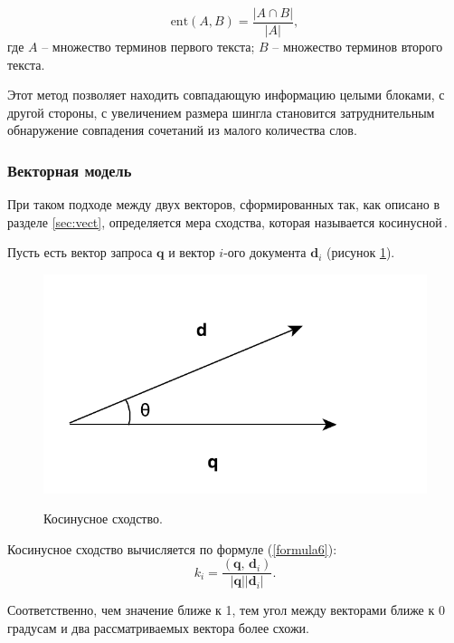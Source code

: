 \begin{equation}\label{formula5}
	\mbox{ent}(A, B) = \frac{\left| A \cap B \right| }{\left| A \right| },
\end{equation}
где $A$ -- множество терминов первого текста; $B$ -- множество терминов второго текста. 

Этот метод позволяет находить совпадающую информацию целыми блоками, с другой стороны, с увеличением размера шингла становится затруднительным обнаружение совпадения сочетаний из малого количества слов. \newline

\subsubsection{Векторная модель}
При таком подходе между двух векторов, сформированных так, как описано в разделе \ref{sec:vect}, определяется мера сходства, которая называется косинусной\,\cite{cos}.

Пусть есть вектор запроса $\textbf{q}$ и вектор $i$-ого документа $\textbf{d}_i$ (рисунок \ref{fig2:image}). 
\begin{figure}[h]
	\begin{center}
		{\includegraphics[scale = 0.6]{img/corner.pdf}}
		\caption{Косинусное сходство.}
		\label{fig2:image}
	\end{center}
\end{figure}

Косинусное сходство вычисляется по формуле (\ref{formula6}):
\begin{equation}\label{formula6}
	k_i = \frac{(\textbf{q}, \, \textbf{d}_i)}{\left| \textbf{q} \right| | \textbf{d}_i | }.
\end{equation}

Соответственно, чем значение ближе к 1, тем угол между векторами ближе к 0 градусам и два рассматриваемых вектора более схожи.

